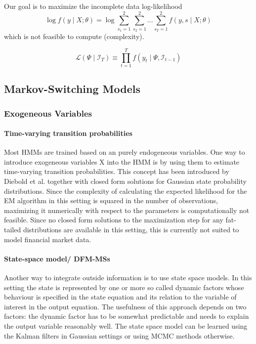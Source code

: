 \documentclass[11pt,a4paper]{article}
\begin{document}
Our goal is to maximize the incomplete data log-likelihood 
$$\log f(y \mid X ; \theta)=\log \sum_{s_{1}=1}^{2} \sum_{s_{2}=1}^{2} \ldots \sum_{s_{T}=1}^{2} f(y, s \mid X ; \theta)$$ which is not feasible to compute (complexity).


$$ \mathcal{L}\left(\Psi \mid \mathcal{I}_T\right) \equiv \prod_{t=1}^T f\left(y_t \mid \Psi, \mathcal{I}_{t-1}\right) $$ 
\subsection{Markov-Switching Models}

\subsubsection{Exogeneous Variables}
\paragraph{Time-varying transition probabilities}
Most HMMs are trained based on an purely endogeneous variables. One way to introduce exogeneous variables X into the HMM is by using them to estimate time-varying transition probabilities. This concept has been introduced by Diebold et al. \cite{diebold_regime_1993} together with closed form solutions for Gaussian state probability distributions. Since the complexity of calculating the expected likelihood for the EM algorithm in this setting is squared in the number of observations, maximizing it numerically with respect to the parameters is computationally not feasible. Since no closed form solutions to the maximization step for any fat-tailed distributions are available in this setting, this is currently not suited to model financial market data.

\paragraph{State-space model/ DFM-MSs}
Another way to integrate outside information is to use state space models. In this setting the state is represented by one or more so called dynamic factors whose behaviour is specified in the state equation and its relation to the variable of interest in the output equation. The usefulness of this approach depends on two factors: the dynamic factor has to be somewhat predictable and 
needs to explain the output variable reasonably well. The state space model can be learned using the Kalman filters in Gaussian settings or using MCMC methods otherwise.
\end{document}
